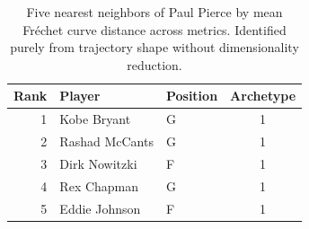 \begin{table}[htbp]
  \centering\small
  \begin{tabular}{rllc}
    \toprule
    Rank & Player & Position & Archetype \\
    \midrule
    1 & Kobe Bryant & G & 1 \\
    2 & Rashad McCants & G & 1 \\
    3 & Dirk Nowitzki & F & 1 \\
    4 & Rex Chapman & G & 1 \\
    5 & Eddie Johnson & F & 1 \\
    \bottomrule
  \end{tabular}
  \caption{Five nearest neighbors of Paul Pierce by mean Fr\'{e}chet curve distance across metrics. Identified purely from trajectory shape without dimensionality reduction.}
  \label{tab:Paul_Pierce_frechet_curve_neighbors}
\end{table}

